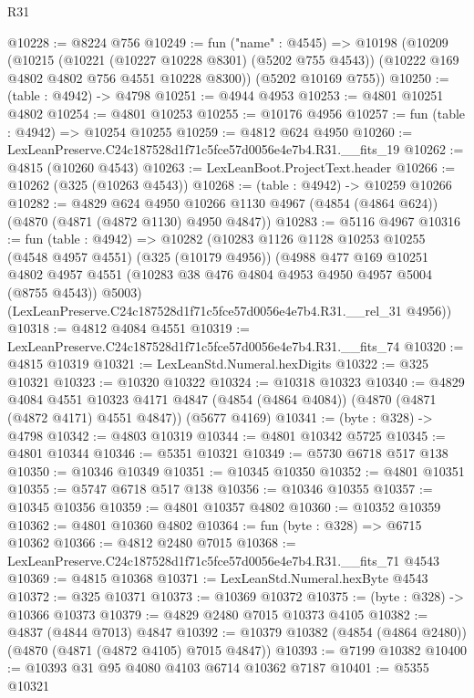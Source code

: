 \begin{lexlean}{R31}
\begin{coremodule}
@10228 := @8224 @756
@10249 := fun ("name" : @4545) =>
  @10198
    (@10209
      (@10215
        (@10221 (@10227 @10228 @8301) (@5202 @755 @4543))
        (@10222 @169 @4802 @4802 @756 @4551 @10228 @8300))
      (@5202 @10169 @755))
@10250 := (table : @4942) -> @4798
@10251 := @4944 @4953
@10253 := @4801 @10251 @4802
@10254 := @4801 @10253
@10255 := @10176 @4956
@10257 := fun (table : @4942) => @10254 @10255
@10259 := @4812 @624 @4950
@10260 := LexLeanPreserve.C24c187528d1f71c5fce57d0056e4e7b4.R31.__fits_19
@10262 := @4815 (@10260 @4543)
@10263 := LexLeanBoot.ProjectText.header
@10266 := @10262 (@325 (@10263 @4543))
@10268 := (table : @4942) -> @10259 @10266
@10282 := @4829
    @624
    @4950
    @10266
    @1130
    @4967
    (@4854 (@4864 @624))
    (@4870 (@4871 (@4872 @1130) @4950 @4847))
@10283 := @5116 @4967
@10316 := fun (table : @4942) =>
  @10282
    (@10283
      @1126
      @1128
      @10253
      @10255
      (@4548 @4957 @4551)
      (@325 (@10179 @4956))
      (@4988
        @477
        @169
        @10251
        @4802
        @4957
        @4551
        (@10283 @38 @476 @4804 @4953 @4950 @4957 @5004 (@8755 @4543))
        @5003)
      (LexLeanPreserve.C24c187528d1f71c5fce57d0056e4e7b4.R31.__rel_31 @4956))
@10318 := @4812 @4084 @4551
@10319 := LexLeanPreserve.C24c187528d1f71c5fce57d0056e4e7b4.R31.__fits_74
@10320 := @4815 @10319
@10321 := LexLeanStd.Numeral.hexDigits
@10322 := @325 @10321
@10323 := @10320 @10322
@10324 := @10318 @10323
@10340 := @4829
    @4084
    @4551
    @10323
    @4171
    @4847
    (@4854 (@4864 @4084))
    (@4870 (@4871 (@4872 @4171) @4551 @4847))
    (@5677 @4169)
@10341 := (byte : @328) -> @4798
@10342 := @4803 @10319
@10344 := @4801 @10342 @5725
@10345 := @4801 @10344
@10346 := @5351 @10321
@10349 := @5730 @6718 @517 @138
@10350 := @10346 @10349
@10351 := @10345 @10350
@10352 := @4801 @10351
@10355 := @5747 @6718 @517 @138
@10356 := @10346 @10355
@10357 := @10345 @10356
@10359 := @4801 @10357 @4802
@10360 := @10352 @10359
@10362 := @4801 @10360 @4802
@10364 := fun (byte : @328) => @6715 @10362
@10366 := @4812 @2480 @7015
@10368 := LexLeanPreserve.C24c187528d1f71c5fce57d0056e4e7b4.R31.__fits_71 @4543
@10369 := @4815 @10368
@10371 := LexLeanStd.Numeral.hexByte @4543
@10372 := @325 @10371
@10373 := @10369 @10372
@10375 := (byte : @328) -> @10366 @10373
@10379 := @4829 @2480 @7015 @10373 @4105
@10382 := @4837 (@4844 @7013) @4847
@10392 := @10379 @10382 (@4854 (@4864 @2480)) (@4870 (@4871 (@4872 @4105) @7015 @4847))
@10393 := @7199 @10382
@10400 := @10393 @31 @95 @4080 @4103 @6714 @10362 @7187
@10401 := @5355 @10321

\end{coremodule}
\end{lexlean}
